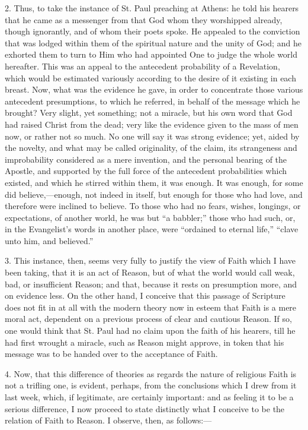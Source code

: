 2. Thus, to take the instance of St. Paul preaching at Athens: he
told his hearers that he came as a messenger from that God whom they
worshipped already, though ignorantly, and of whom their poets spoke.
He appealed to the conviction that was lodged within them of the
spiritual nature and the unity of God; and he exhorted them to turn to
Him who had appointed One to judge the whole world hereafter. This was
an appeal to the antecedent probability of a Revelation, which would
be estimated variously according to the desire of it existing in each
breast. Now, what was the evidence he gave, in order to concentrate
those various antecedent presumptions, to which he referred, in behalf
of the message which he brought? Very slight, yet something; not a
miracle, but his own word that God had raised Christ from the dead;
very like the evidence given to the mass of men now, or rather not so
much. No one will say it was strong evidence; yet, aided by the
novelty, and what may be called originality, of the claim, its
strangeness and improbability considered as a mere invention, and the
personal bearing of the Apostle, and supported by the full force of
the antecedent probabilities which existed, and which he stirred
within them, it was enough. It was enough, for some did believe,—enough,
not indeed in itself, but enough for those who had love, and therefore
were inclined to believe. To those who had no fears, wishes, longings,
or expectations, of another world, he was but ``a babbler;''
those who had such, or, in the Evangelist's words in another place,
were ``ordained to eternal life,'' ``clave unto him, and
believed.''

3. This instance, then, seems very fully to justify the view of
Faith which I have been taking, that it is an act of Reason, but of
what the world would call weak, bad, or insufficient Reason; and that,
because it rests on presumption more, and on evidence less. On the
other hand, I conceive that this passage of Scripture does not fit in
at all with the modern theory now in esteem that Faith is a mere moral
act, dependent on a previous process of clear and cautious Reason. If
so, one would think that St. Paul had no claim upon the faith of his
hearers, till he had first wrought a miracle, such as Reason might
approve, in token that his message was to be handed over to the
acceptance of Faith.

4. Now, that this difference of theories as regards the nature of
religious Faith is not a trifling one, is evident, perhaps, from the
conclusions which I drew from it last week, which, if legitimate, are
certainly important: and as feeling it to be a serious difference, I
now proceed to state distinctly what I conceive to be the relation of
Faith to Reason. I observe, then, as follows:—

